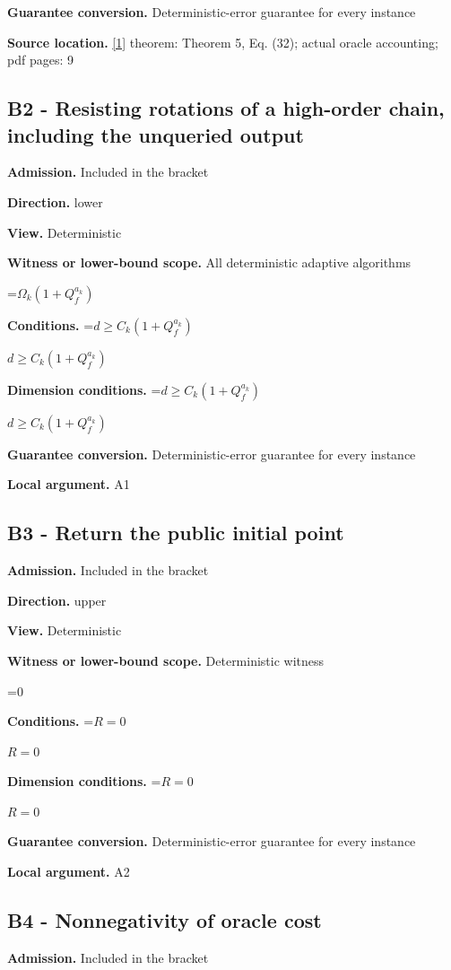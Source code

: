 \documentclass[10pt,a4paper]{article}
\newcommand{\AtlasMath}[1]{\par\begingroup\centering\setbox0=\hbox{$\displaystyle #1$}\ifdim\wd0>1.4\linewidth\typeout{ATLAS WIDE FORMULA: \the\wd0}\fi\ifdim\wd0>\linewidth\resizebox{\linewidth}{!}{\box0}\else\box0\fi\par\endgroup}
\newcommand{\AtlasInlineMath}[1]{\begingroup\setbox0=\hbox{$#1$}\ifdim\wd0>.4\linewidth\endgroup\AtlasMath{#1}\else\endgroup$#1$\fi}
\begin{document}
\textbf{Guarantee conversion.} Deterministic-error guarantee for every instance

\textbf{Source location.} \href{https://arxiv.org/pdf/2205.09647v1}{[1]} theorem: Theorem 5, Eq. (32); actual oracle accounting; pdf pages: 9

\subsection{B2 - Resisting rotations of a high-order chain, including the unqueried output}
\textbf{Admission.} Included in the bracket

\textbf{Direction.} lower

\textbf{View.} Deterministic

\textbf{Witness or lower-bound scope.} All deterministic adaptive algorithms

\AtlasMath{\Omega_k(1+Q_f^{a_k})}
\textbf{Conditions.} \AtlasInlineMath{d\ge C_k(1+Q_f^{a_k})}

\textbf{Dimension conditions.} \AtlasInlineMath{d\ge C_k(1+Q_f^{a_k})}

\textbf{Guarantee conversion.} Deterministic-error guarantee for every instance

\textbf{Local argument.} A1

\subsection{B3 - Return the public initial point}
\textbf{Admission.} Included in the bracket

\textbf{Direction.} upper

\textbf{View.} Deterministic

\textbf{Witness or lower-bound scope.} Deterministic witness

\AtlasMath{0}
\textbf{Conditions.} \AtlasInlineMath{R=0}

\textbf{Dimension conditions.} \AtlasInlineMath{R=0}

\textbf{Guarantee conversion.} Deterministic-error guarantee for every instance

\textbf{Local argument.} A2

\subsection{B4 - Nonnegativity of oracle cost}
\textbf{Admission.} Included in the bracket
\end{document}
